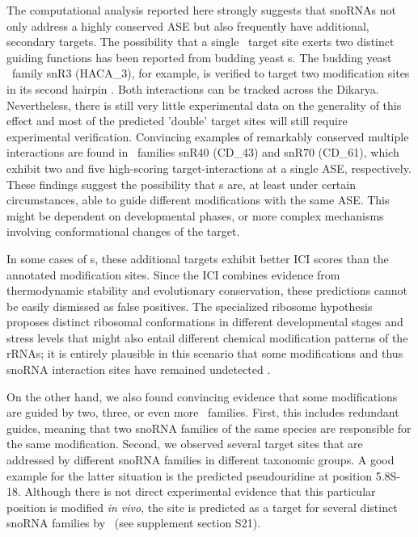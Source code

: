 The computational analysis reported here strongly suggests that
snoRNAs not only address a highly conserved ASE but also frequently
have additional, secondary targets. The possibility that a single
\sno\ target site exerts two distinct guiding functions has been
reported from budding yeast \haca s. The budding yeast \sno\ family
snR3 (HACA\_3), for example, is verified to target two modification
sites in its second hairpin \cite{Schattner:2004}.  Both interactions
can be tracked across the Dikarya.  Nevertheless, there is still very
little experimental data on the generality of this effect and most of
the predicted 'double' target sites will still require experimental
verification. Convincing examples of remarkably conserved multiple
interactions are found in \cd\ families snR40 (CD\_43) and snR70
(CD\_61), which exhibit two and five high-scoring target-interactions
at a single ASE, respectively.  These findings suggest the possibility
that \sno s are, at least under certain circumstances, able to guide
different modifications with the same ASE. This might be dependent on
developmental phases, or more complex mechanisms involving
conformational changes of the target.

In some cases of \haca s, these additional targets exhibit better ICI
scores than the annotated modification sites. Since the ICI combines
evidence from thermodynamic stability and evolutionary conservation, these
predictions cannot be easily dismissed as false positives. The specialized
ribosome hypothesis proposes distinct ribosomal conformations in different
developmental stages and stress levels that might also entail different
chemical modification patterns of the rRNAs; it is entirely plausible in
this scenario that some modifications and thus snoRNA interaction sites
have remained undetected \citep{Xue:2012}.  

On the other hand, we also found convincing evidence that some
modifications are guided by two, three, or even more \sno\
families. First, this includes redundant guides, meaning that two
snoRNA families of the same species are responsible for the same
modification. Second, we observed several target sites that are
addressed by different snoRNA families in different taxonomic
groups. A good example for the latter situation is the predicted
pseudouridine at position 5.8S-18. Although there is not direct
experimental evidence that this particular position is modified
\emph{in vivo}, the site is predicted as a target for several distinct
snoRNA families by \snoop\ (see supplement section S21).

